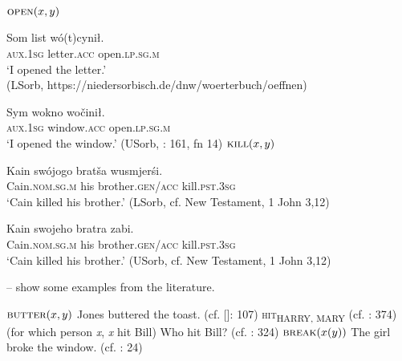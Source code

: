 \documentclass[output=paper]{langscibook}
\begin{document}
\ea%
    \label{ex:junghanns:11}
  \ea     $\textsc{open} (x, y)$ \label{ex:junghanns:11a}

  \ex \gll   Som list wó(t)cynił.\\
    \textsc{aux}.\textsc{1sg} letter.\textsc{acc} open.\textsc{lp.sg.m}\\
    \glt ‘I opened the letter.’ \\ \hfill(LSorb, https://niedersorbisch.de/dnw/woerterbuch/oeffnen)\label{ex:junghanns:11b} 

  \ex \gll   Sym wokno wočinił.\\
    \textsc{aux}.\textsc{1sg} window.\textsc{acc} open.\textsc{lp.sg.m}\\
    \glt ‘I opened the window.’ \hfill (USorb, \citealt{Breu2011}: 161, fn 14)\label{ex:junghanns:11c}
\z
\ex%
    \label{ex:junghanns:12}
  \ea     $\textsc{kill} (x, y)$ \label{ex:junghanns:12a}

  \ex \gll  Kain swójogo bratša wusmjerśi.\\
            Cain.\textsc{nom.sg.m} his brother.\textsc{gen/acc} kill.\textsc{pst.3sg}\\
    \glt ‘Cain killed his brother.’ \hfill ({LSorb,} cf. New Testament, 1 John 3,12)\label{ex:junghanns:12b} 

  \ex \gll   Kain swojeho bratra zabi.\\
    Cain.\textsc{nom.sg.m} his brother.\textsc{gen/acc} kill.\textsc{pst.3sg}\\
    \glt ‘Cain killed his brother.’ \hfill (USorb, cf. New Testament, 1 John 3,12)\label{ex:junghanns:12c}
\z
\z

\noindent {}-- show some examples from the literature.

\ea%
    \label{ex:junghanns:13}
  \ea   $\textsc{butter} (x, y)$
  \ex Jones buttered the toast. (cf. \citealt{Davidson1980} [\citeyear{Davidson1967a}]: 107)
\z
\ex%
    \label{ex:junghanns:14}
    \textsc{hit}\textsc{\textsubscript{HARRY, MARY}}
  (cf. \citealt{Fillmore1968}: 374)
\ex%
    \label{ex:junghanns:15}
  \ea  (for which person \textit{x}, \textit{x} hit Bill)
  \ex Who hit Bill? (cf. \citealt{Chomsky81Lectures-on-government}: 324)
\z
\ex%
    \label{ex:junghanns:16}
  \ea     $\textsc{break} (x (y))$
  \ex     The girl broke the window. (cf. \citealt{Grimshaw1990}: 24)
\z
\z
\end{document}
